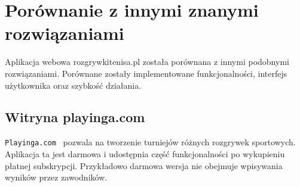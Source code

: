 \documentclass[shortabstract]{iithesis}
\begin{document}
\section{Porównanie z innymi znanymi rozwiązaniami}
Aplikacja webowa rozgrywkitenisa.pl została porównana z innymi podobnymi rozwiązaniami.
Porównane zostały implementowane funkcjonalności, interfejs użytkownika oraz szybkość działania.

\subsection{Witryna playinga.com}
\texttt{Playinga.com}~\cite{Playinga} pozwala na tworzenie turniejów różnych rozgrywek sportowych.
Aplikacja ta jest darmowa i udostępnia część funkcjonalności po wykupieniu płatnej subskrypcji.
Przykładowo darmowa wersja nie obejmuje wpisywania wyników przez zawodników.
\end{document}
